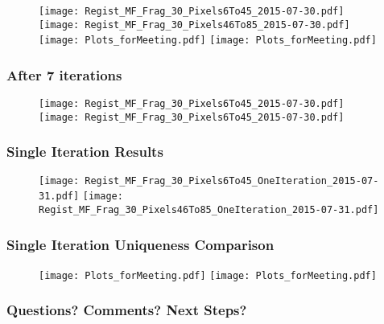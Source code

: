 \documentclass[10pt,dvipsnames,table]{beamer}
\begin{document}
\begin{frame}
\begin{figure}
\texttt{[image: Regist\_MF\_Frag\_30\_Pixels6To45\_2015-07-30.pdf]}
\texttt{[image: Regist\_MF\_Frag\_30\_Pixels46To85\_2015-07-30.pdf]} \\
\texttt{[image: Plots\_forMeeting.pdf]}
\texttt{[image: Plots\_forMeeting.pdf]}
\end{figure}
\end{frame}

\begin{frame}
\frametitle{After 7 iterations}
\begin{figure}
\texttt{[image: Regist\_MF\_Frag\_30\_Pixels6To45\_2015-07-30.pdf]}
\texttt{[image: Regist\_MF\_Frag\_30\_Pixels6To45\_2015-07-30.pdf]}
\end{figure}
\end{frame}

\begin{frame}
\frametitle{Single Iteration Results}
\begin{figure}
\texttt{[image: Regist\_MF\_Frag\_30\_Pixels6To45\_OneIteration\_2015-07-31.pdf]}
\texttt{[image: Regist\_MF\_Frag\_30\_Pixels46To85\_OneIteration\_2015-07-31.pdf]}
\end{figure}
\end{frame}

\begin{frame}
\frametitle{Single Iteration Uniqueness Comparison}
\begin{figure}
\texttt{[image: Plots\_forMeeting.pdf]}
\texttt{[image: Plots\_forMeeting.pdf]}
\end{figure}
\end{frame}

\begin{frame}
\frametitle{Questions? Comments? Next Steps?}



\end{frame}
\end{document}
